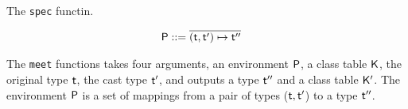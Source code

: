 \documentclass[a4paper,UKenglish,final]{tex/lipics-v2016}
\begin{document}
The \texttt{spec} functin.


\hrulefill

\opdef{
  $\meett{\P, \K, \t, \tp} = {\tpp}~\K$
}{
}
\begin{align*}
\P &::= \b{(\t,\tp) \mapsto \tpp}
\end{align*}

\begin{mathpar}





\end{mathpar}

The \texttt{meet} functions takes four arguments, an environment $\P$, a class table $\K$, the original type $\t$, the cast type $\tp$, 
and outputs a type $\tpp$ and a class table $\Kp$. The environment $\P$ is a set of mappings from a pair of types ($\t,\tp$) to a type $\tpp$.


\hrulefill

\opdef{
  $\meett{\P, \K, {\Type{\b\mt}}, {\Type{\b\mt}}} = {\Type{\b\mt}}~\K$
}{
}
\end{document}
